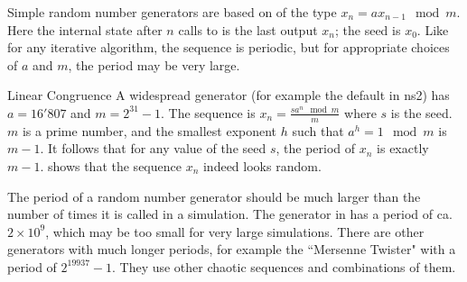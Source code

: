 Simple random number generators are based on  of the type $ x_n = a x_{n-1} \mod m $. Here the
internal state after $n$ calls to  is the last output
$x_n$; the seed is $x_0$. Like for any iterative algorithm, the
sequence is periodic, but for appropriate choices of $a$ and
$m$, the period may be very large.

\begin{ex}{Linear Congruence}
A widespread generator (for example the default in ns2) has
$a=16'807$ and $m=2^{31}-1$. The sequence is $x_n= \frac{s a^n
\mod m}{m}$ where $s$ is the seed. $m$ is a prime number, and
the smallest exponent $h$ such that $a^h=1 \mod m$ is $m-1$. It
follows that for any value of the seed $s$, the period of $x_n$
is exactly $m-1$.  shows that the sequence $x_n$
indeed looks random.
\end{ex}
\begin{figure}
 \begin{center}
 \end{center}%
\end{figure}


The period of a random number generator should be much larger
than the number of times it is called in a simulation. The
generator in  has a period of ca. $2 \times
10^9$, which may be too small for very large simulations. There
are other generators with much longer periods, for example the
``Mersenne Twister" \cite{matsumoto1998mersenne} with a period
of $2^{19937}-1$. They use other chaotic sequences and
combinations of them.

